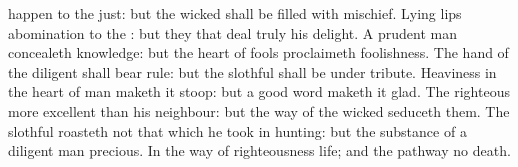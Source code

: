 {happen to the
just: but the
wicked shall be
filled with
mischief.
Lying
lips
{}
abomination to the
{}: but they that
deal
truly
{} his
delight.
A
prudent
man
concealeth
knowledge: but the
heart of
fools
proclaimeth
foolishness.
The
hand of the
diligent shall bear
rule: but the
slothful shall be under
tribute.
Heaviness in the
heart of
man maketh it
stoop: but a
good
word maketh it
glad.
The
righteous
{} more
excellent than his
neighbour: but the
way of the
wicked
seduceth them.
The
slothful
{}
roasteth not that which he took in
hunting: but the
substance of a
diligent
man
{}
precious.
In the
way of
righteousness
{}
life; and
{} the
pathway
{} no
death.

}
